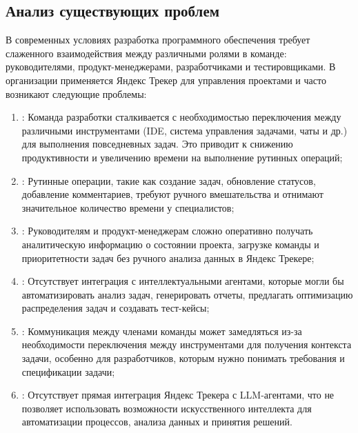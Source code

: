 \documentclass[utf8, russian]{eskdtext}
\begin{document}
\subsection{Анализ существующих проблем}

В современных условиях разработка программного обеспечения требует слаженного взаимодействия между различными ролями в команде: руководителями, продукт-менеджерами, разработчиками и тестировщиками. В организации применяется Яндекс Трекер для управления проектами и часто возникают следующие проблемы:

\begin{enumerate}
    \item {}: Команда разработки сталкивается с необходимостью переключения между различными инструментами (IDE, система управления задачами, чаты и др.) для выполнения повседневных задач. Это приводит к снижению продуктивности и увеличению времени на выполнение рутинных операций;
    
    \item {}: Рутинные операции, такие как создание задач, обновление статусов, добавление комментариев, требуют ручного вмешательства и отнимают значительное количество времени у специалистов;
    
    \item {}: Руководителям и продукт-менеджерам сложно оперативно получать аналитическую информацию о состоянии проекта, загрузке команды и приоритетности задач без ручного анализа данных в Яндекс Трекере;
    
    \item {}: Отсутствует интеграция с интеллектуальными агентами, которые могли бы автоматизировать анализ задач, генерировать отчеты, предлагать оптимизацию распределения задач и создавать тест-кейсы;
    
    \item {}: Коммуникация между членами команды может замедляться из-за необходимости переключения между инструментами для получения контекста задачи, особенно для разработчиков, которым нужно понимать требования и спецификации задачи;
    
    \item {}: Отсутствует прямая интеграция Яндекс Трекера с LLM-агентами, что не позволяет использовать возможности искусственного интеллекта для автоматизации процессов, анализа данных и принятия решений.
\end{enumerate}
\end{document}
